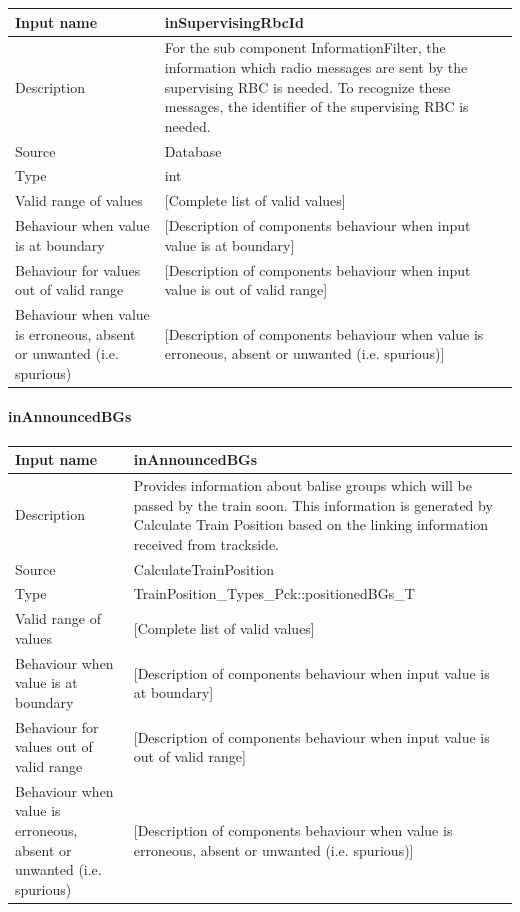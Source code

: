 \begin{longtable}{p{}p{}}
\toprule
Input name				& inSupervisingRbcId \\
\midrule
Description				& For the sub component InformationFilter, the information which radio messages are sent by the supervising RBC is needed. To recognize these messages, the identifier of the supervising RBC is needed. \\
\midrule
Source					& Database \\ 
\midrule
Type					& int \\
\midrule
Valid range of values	& [Complete list of valid values] \\
\midrule
Behaviour when value is at boundary	& [Description of components behaviour when input value is at boundary] \\
\midrule
Behaviour for values out of valid range	& [Description of components behaviour when input value is out of valid range] \\
\midrule
Behaviour when value is erroneous, absent or unwanted (i.e. spurious) & [Description of components behaviour when value is erroneous, absent or unwanted (i.e. spurious)] \\
\bottomrule
\end{longtable}


\paragraph{inAnnouncedBGs}

\begin{longtable}{p{}p{}}
\toprule
Input name				& inAnnouncedBGs \\
\midrule
Description				& Provides information about balise groups which will be passed by the train soon. This information is generated by Calculate Train Position based on the linking information received from trackside. \\
\midrule
Source					& CalculateTrainPosition \\ 
\midrule
Type					& TrainPosition\_Types\_Pck::positionedBGs\_T \\
\midrule
Valid range of values	& [Complete list of valid values] \\
\midrule
Behaviour when value is at boundary	& [Description of components behaviour when input value is at boundary] \\
\midrule
Behaviour for values out of valid range	& [Description of components behaviour when input value is out of valid range] \\
\midrule
Behaviour when value is erroneous, absent or unwanted (i.e. spurious) & [Description of components behaviour when value is erroneous, absent or unwanted (i.e. spurious)] \\
\bottomrule
\end{longtable}



